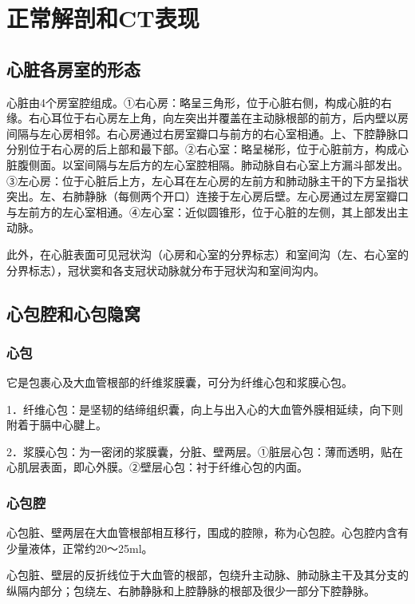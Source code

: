 \section{正常解剖和CT表现}

\subsection{心脏各房室的形态}

心脏由4个房室腔组成。①右心房：略呈三角形，位于心脏右侧，构成心脏的右缘。右心耳位于右心房左上角，向左突出并覆盖在主动脉根部的前方，后内壁以房间隔与左心房相邻。右心房通过右房室瓣口与前方的右心室相通。上、下腔静脉口分别位于右心房的后上部和最下部。②右心室：略呈梯形，位于心脏前方，构成心脏腹侧面。以室间隔与左后方的左心室腔相隔。肺动脉自右心室上方漏斗部发出。③左心房：位于心脏后上方，左心耳在左心房的左前方和肺动脉主干的下方呈指状突出。左、右肺静脉（每侧两个开口）连接于左心房后壁。左心房通过左房室瓣口与左前方的左心室相通。④左心室：近似圆锥形，位于心脏的左侧，其上部发出主动脉。

此外，在心脏表面可见冠状沟（心房和心室的分界标志）和室间沟（左、右心室的分界标志），冠状窦和各支冠状动脉就分布于冠状沟和室间沟内。

\subsection{心包腔和心包隐窝}

\subsubsection{心包}

它是包裹心及大血管根部的纤维浆膜囊，可分为纤维心包和浆膜心包。

1．纤维心包：是坚韧的结缔组织囊，向上与出入心的大血管外膜相延续，向下则附着于膈中心腱上。

2．浆膜心包：为一密闭的浆膜囊，分脏、壁两层。①脏层心包：薄而透明，贴在心肌层表面，即心外膜。②壁层心包：衬于纤维心包的内面。

\subsubsection{心包腔}

心包脏、壁两层在大血管根部相互移行，围成的腔隙，称为心包腔。心包腔内含有少量液体，正常约20～25ml。

心包脏、壁层的反折线位于大血管的根部，包绕升主动脉、肺动脉主干及其分支的纵隔内部分；包绕左、右肺静脉和上腔静脉的根部及很少一部分下腔静脉。

